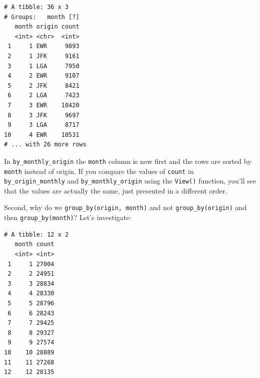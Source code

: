\documentclass[12pt,]{krantz}
\makeatletter
\newenvironment{Shaded}{\begin{snugshade}}{\end{snugshade}}
\newcommand{\KeywordTok}[1]{\textcolor[rgb]{0.27,0.27,0.27}{\textbf{#1}}}
\newcommand{\DataTypeTok}[1]{\textcolor[rgb]{0.27,0.27,0.27}{#1}}
\newcommand{\StringTok}[1]{\textcolor[rgb]{0.5,0.5,0.5}{#1}}
\newcommand{\OperatorTok}[1]{\textcolor[rgb]{0.43,0.43,0.43}{\textbf{#1}}}
\newcommand{\NormalTok}[1]{#1}
\newenvironment{kframe}{%
\medskip{}
\setlength{\fboxsep}{.8em}
 \def\at@end@of@kframe{}%
 \ifinner\ifhmode%
  \def\at@end@of@kframe{\end{minipage}}%
  \begin{minipage}{\columnwidth}%
 \fi\fi%
 \def\FrameCommand##1{\hskip\@totalleftmargin \hskip-\fboxsep
 \colorbox{shadecolor}{##1}\hskip-\fboxsep
     \hskip-\linewidth \hskip-\@totalleftmargin \hskip\columnwidth}%
 \MakeFramed {\advance\hsize-\width
   \@totalleftmargin\z@ \linewidth\hsize
   \@setminipage}}%
 {\par\unskip\endMakeFramed%
 \at@end@of@kframe}
\renewenvironment{Shaded}{\begin{kframe}}{\end{kframe}}
\makeatother
\begin{document}
\begin{Shaded}
\end{Shaded}

\begin{verbatim}
# A tibble: 36 x 3
# Groups:   month [?]
   month origin count
   <int> <chr>  <int>
 1     1 EWR     9893
 2     1 JFK     9161
 3     1 LGA     7950
 4     2 EWR     9107
 5     2 JFK     8421
 6     2 LGA     7423
 7     3 EWR    10420
 8     3 JFK     9697
 9     3 LGA     8717
10     4 EWR    10531
# ... with 26 more rows
\end{verbatim}

In \texttt{by\_monthly\_origin} the \texttt{month} column is now first
and the rows are sorted by \texttt{month} instead of origin. If you
compare the values of \texttt{count} in \texttt{by\_origin\_monthly} and
\texttt{by\_monthly\_origin} using the \texttt{View()} function, you'll
see that the values are actually the same, just presented in a different
order.

Second, why do we \texttt{group\_by(origin,\ month)} and not
\texttt{group\_by(origin)} and then \texttt{group\_by(month)}? Let's
investigate:

\begin{Shaded}
\end{Shaded}

\begin{verbatim}
# A tibble: 12 x 2
   month count
   <int> <int>
 1     1 27004
 2     2 24951
 3     3 28834
 4     4 28330
 5     5 28796
 6     6 28243
 7     7 29425
 8     8 29327
 9     9 27574
10    10 28889
11    11 27268
12    12 28135
\end{verbatim}
\end{document}
